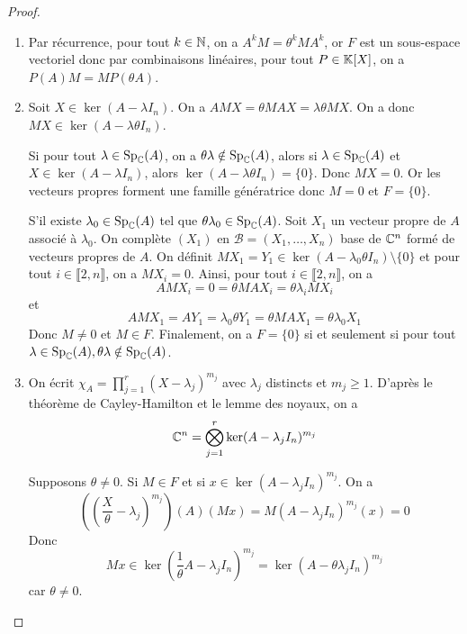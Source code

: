 \documentclass[12pt]{article}
\begin{document}
\begin{proof}
	\phantom{}
	\begin{enumerate}
		\item Par récurrence, pour tout $k\in\mathbb{N}$, on a $A^{k}M=\theta^{k}MA^{k}$, or $F$ est un sous-espace vectoriel donc par combinaisons linéaires, pour tout $P\in\mathbb{K}[X]$, on a $P(A)M=MP(\theta A)$.
		
		\item Soit $X\in\ker(A-\lambda I_{n})$. On a $AMX=\theta MAX=\lambda\theta MX$. On a donc $MX\in\ker(A-\lambda\theta I_{n})$.
		
		Si pour tout $\lambda\in\operatorname{Sp}_{\mathbb{C}}(A)$, on a $\theta\lambda\notin\operatorname{Sp}_{\mathbb{C}}(A)$, alors si $\lambda\in\operatorname{Sp}_{\mathbb{C}}(A)$ et $X\in\ker(A-\lambda I_{n})$, alors $\ker(A-\lambda\theta I_{n})=\lbrace0\rbrace$. Donc $MX=0$. Or les vecteurs propres forment une famille génératrice donc $M=0$ et $F=\lbrace0\rbrace$.

		S'il existe $\lambda_{0}\in\operatorname{Sp}_{\mathbb{C}}(A)$ tel que $\theta\lambda_{0}\in\operatorname{Sp}_{\mathbb{C}}(A)$. Soit $X_{1}$ un vecteur propre de $A$ associé à $\lambda_{0}$. On complète $(X_{1})$ en $\mathcal{B}=(X_{1},\dots,X_{n})$ base de $\mathbb{C}^{n}$ formé de vecteurs propres de $A$. On définit $MX_{1}=Y_{1}\in\ker(A-\lambda_{0}\theta I_{n})\setminus\lbrace0\rbrace$ et pour tout $i\in\llbracket2,n\rrbracket$, on a $MX_{i}=0$. Ainsi, pour tout $i\in\llbracket2,n\rrbracket$, on a 
		\begin{equation}
			AMX_{i}=0=\theta MAX_{i}=\theta\lambda_{i}MX_{i}
		\end{equation}
		et 
		\begin{equation}
			AMX_{1}=AY_{1}=\lambda_{0}\theta Y_{1}=\theta MAX_{1}=\theta\lambda_{0}X_{1}
		\end{equation}
		Donc $M\neq0$ et $M\in F$. Finalement, on a $F=\lbrace0\rbrace$ si et seulement si pour tout $\lambda\in\operatorname{Sp}_{\mathbb{C}}(A),\theta\lambda\notin\operatorname{Sp}_{\mathbb{C}}(A)$.

		\item On écrit $\chi_{A}=\prod_{j=1}^{r}(X-\lambda_{j})^{m_{j}}$ avec $\lambda_{j}$ distincts et $m_{j}\geqslant1$. D'après le théorème de Cayley-Hamilton et le lemme des noyaux, on a 
		\begin{equation}
			\mathbb{C}^{n}=\bigotimes_{j=1}^{r}\ker(A-\lambda_{j}I_{n})^{m_{j}}
		\end{equation}

		Supposons $\theta\neq0$. Si $M\in F$ et si $x\in \ker(A-\lambda_{j}I_{n})^{m_{j}}$. On a 
		\begin{equation}
			\left(\left(\frac{X}{\theta}-\lambda_{j}\right)^{m_{j}}\right)(A)(Mx)=M\left(A-\lambda_{j}I_{n}\right)^{m_{j}}(x)=0
		\end{equation}
		Donc 
		\begin{equation}
			Mx\in\ker\left(\frac{1}{\theta}A-\lambda_{j}I_{n}\right)^{m_{j}}=\ker\left(A-\theta\lambda_{j}I_{n}\right)^{m_{j}}
		\end{equation}
		car $\theta\neq0$.


\end{enumerate}
\end{proof}
\end{document}
